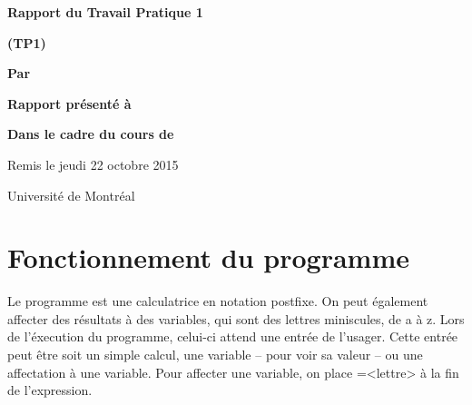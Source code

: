 \documentclass[letterpaper,12pt]{scrartcl}
\begin{document}
	\begin{center}
		\vspace{2cm}

		{\Huge\bf\sf Rapport du Travail Pratique 1}

		\vspace{0.5cm}

		{\bf\sf (TP1)}

		\vspace{4cm}

		{\bf\sf Par}

		\vspace{0.5cm}{\large\bf\sf Sulliman Aïad et François Poitras}

		\vspace{2cm}

		{\bf\sf Rapport présenté à}

		\vspace{0.5cm}{\large\bf\sf M. Marc  Feeley}

		\vspace{2cm}

		{\bf\sf Dans le cadre du cours de}

		\vspace{0.5cm}{\large\bf\sf Concepts des langages de programmation (IFT2035)}

		\vspace{\fill}
		Remis le jeudi 22 octobre 2015

		\vspace{0.5cm}Université de Montréal
	\end{center}
	
	\newpage

	\pagestyle{cb}
	
	\tableofcontents

	\newpage
	
	\section{Fonctionnement du programme}
		Le programme est une calculatrice en notation postfixe. On peut également affecter des résultats à des variables, qui sont des lettres miniscules, de a à z. Lors de l'éxecution du programme, celui-ci attend une entrée de l'usager. Cette entrée peut être soit un simple calcul, une variable -- pour voir sa valeur -- ou une affectation à une variable. Pour affecter une variable, on place =<lettre> à la fin de l'expression.
			
	
\end{document}

